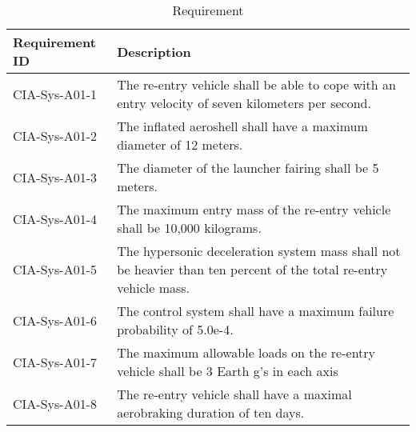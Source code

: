 \begin{table}[H]
	\caption{Requirement}
	\begin{tabular}{|p{}|p{}|}
    \hline
    Requirement ID          & Description                                                                                                      \\ \hline \hline
    CIA-Sys-A01-1 & The re-entry vehicle shall be able to cope with an entry velocity of seven kilometers per second.                \\ \hline
    CIA-Sys-A01-2 & The inflated aeroshell shall have a maximum diameter of 12 meters.                                               \\ \hline
    CIA-Sys-A01-3 & The diameter of the launcher fairing shall be 5 meters.                                                          \\ \hline
    CIA-Sys-A01-4 & The maximum entry mass of the re-entry vehicle shall be 10,000 kilograms.                                         \\ \hline
    CIA-Sys-A01-5 & The hypersonic deceleration system mass shall not be heavier than ten percent of the total re-entry vehicle mass. \\ \hline
    CIA-Sys-A01-6 & The control system shall have a maximum failure probability of 5.0e-4.                                           \\ \hline
    CIA-Sys-A01-7 & The maximum allowable loads on the re-entry vehicle shall be 3 Earth g's in each axis                            \\ \hline
    CIA-Sys-A01-8 & The re-entry vehicle shall have a maximal aerobraking duration of ten days.                                      \\ \hline
    \end{tabular}
    \label{tab:requirements}
\end{table}

